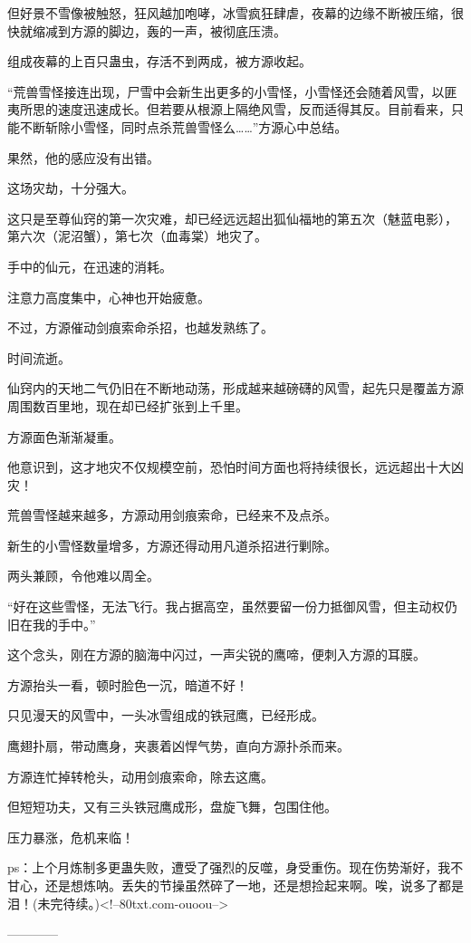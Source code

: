 \begin{this_body}
但好景不雪像被触怒，狂风越加咆哮，冰雪疯狂肆虐，夜幕的边缘不断被压缩，很快就缩减到方源的脚边，轰的一声，被彻底压溃。

组成夜幕的上百只蛊虫，存活不到两成，被方源收起。

“荒兽雪怪接连出现，尸雪中会新生出更多的小雪怪，小雪怪还会随着风雪，以匪夷所思的速度迅速成长。但若要从根源上隔绝风雪，反而适得其反。目前看来，只能不断斩除小雪怪，同时点杀荒兽雪怪么……”方源心中总结。

果然，他的感应没有出错。

这场灾劫，十分强大。

这只是至尊仙窍的第一次灾难，却已经远远超出狐仙福地的第五次（魅蓝电影），第六次（泥沼蟹），第七次（血毒棠）地灾了。

手中的仙元，在迅速的消耗。

注意力高度集中，心神也开始疲惫。

不过，方源催动剑痕索命杀招，也越发熟练了。

时间流逝。

仙窍内的天地二气仍旧在不断地动荡，形成越来越磅礴的风雪，起先只是覆盖方源周围数百里地，现在却已经扩张到上千里。

方源面色渐渐凝重。

他意识到，这才地灾不仅规模空前，恐怕时间方面也将持续很长，远远超出十大凶灾！

荒兽雪怪越来越多，方源动用剑痕索命，已经来不及点杀。

新生的小雪怪数量增多，方源还得动用凡道杀招进行剿除。

两头兼顾，令他难以周全。

“好在这些雪怪，无法飞行。我占据高空，虽然要留一份力抵御风雪，但主动权仍旧在我的手中。”

这个念头，刚在方源的脑海中闪过，一声尖锐的鹰啼，便刺入方源的耳膜。

方源抬头一看，顿时脸色一沉，暗道不好！

只见漫天的风雪中，一头冰雪组成的铁冠鹰，已经形成。

鹰翅扑扇，带动鹰身，夹裹着凶悍气势，直向方源扑杀而来。

方源连忙掉转枪头，动用剑痕索命，除去这鹰。

但短短功夫，又有三头铁冠鹰成形，盘旋飞舞，包围住他。

压力暴涨，危机来临！

ps：上个月炼制多更蛊失败，遭受了强烈的反噬，身受重伤。现在伤势渐好，我不甘心，还是想炼呐。丢失的节操虽然碎了一地，还是想捡起来啊。唉，说多了都是泪！(未完待续。)<!--80txt.com-ouoou-->

------------

\end{this_body}

